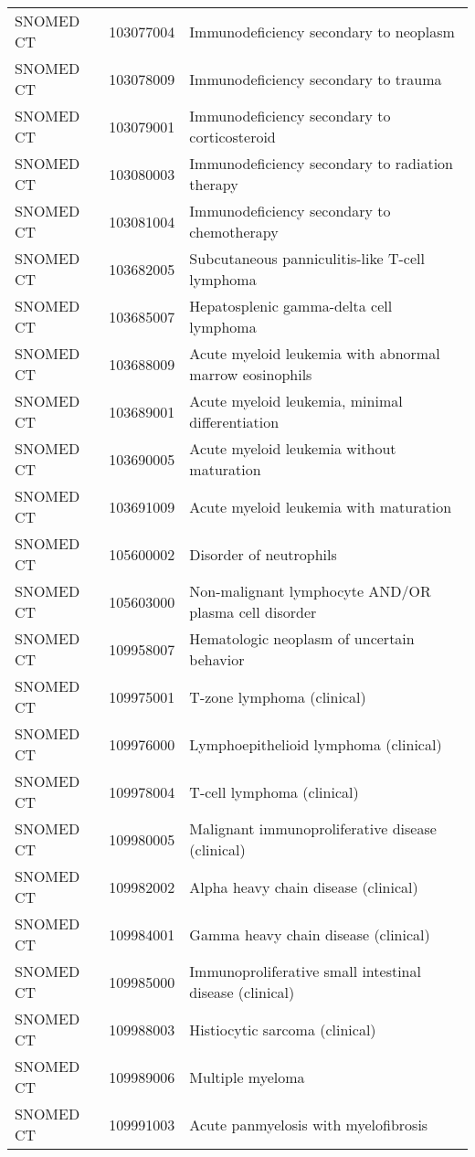 \begin{longtable}{p{}p{}p{}}
  SNOMED CT & 103077004 & Immunodeficiency secondary to neoplasm \\ 
  SNOMED CT & 103078009 & Immunodeficiency secondary to trauma \\ 
  SNOMED CT & 103079001 & Immunodeficiency secondary to corticosteroid \\ 
  SNOMED CT & 103080003 & Immunodeficiency secondary to radiation therapy \\ 
  SNOMED CT & 103081004 & Immunodeficiency secondary to chemotherapy \\ 
  SNOMED CT & 103682005 & Subcutaneous panniculitis-like T-cell lymphoma \\ 
  SNOMED CT & 103685007 & Hepatosplenic gamma-delta cell lymphoma \\ 
  SNOMED CT & 103688009 & Acute myeloid leukemia with abnormal marrow eosinophils \\ 
  SNOMED CT & 103689001 & Acute myeloid leukemia, minimal differentiation \\ 
  SNOMED CT & 103690005 & Acute myeloid leukemia without maturation \\ 
  SNOMED CT & 103691009 & Acute myeloid leukemia with maturation \\ 
  SNOMED CT & 105600002 & Disorder of neutrophils \\ 
  SNOMED CT & 105603000 & Non-malignant lymphocyte AND/OR plasma cell disorder \\ 
  SNOMED CT & 109958007 & Hematologic neoplasm of uncertain behavior \\ 
  SNOMED CT & 109975001 & T-zone lymphoma (clinical) \\ 
  SNOMED CT & 109976000 & Lymphoepithelioid lymphoma (clinical) \\ 
  SNOMED CT & 109978004 & T-cell lymphoma (clinical) \\ 
  SNOMED CT & 109980005 & Malignant immunoproliferative disease (clinical) \\ 
  SNOMED CT & 109982002 & Alpha heavy chain disease (clinical) \\ 
  SNOMED CT & 109984001 & Gamma heavy chain disease (clinical) \\ 
  SNOMED CT & 109985000 & Immunoproliferative small intestinal disease (clinical) \\ 
  SNOMED CT & 109988003 & Histiocytic sarcoma (clinical) \\ 
  SNOMED CT & 109989006 & Multiple myeloma \\ 
  SNOMED CT & 109991003 & Acute panmyelosis with myelofibrosis \\ 

\end{longtable}
